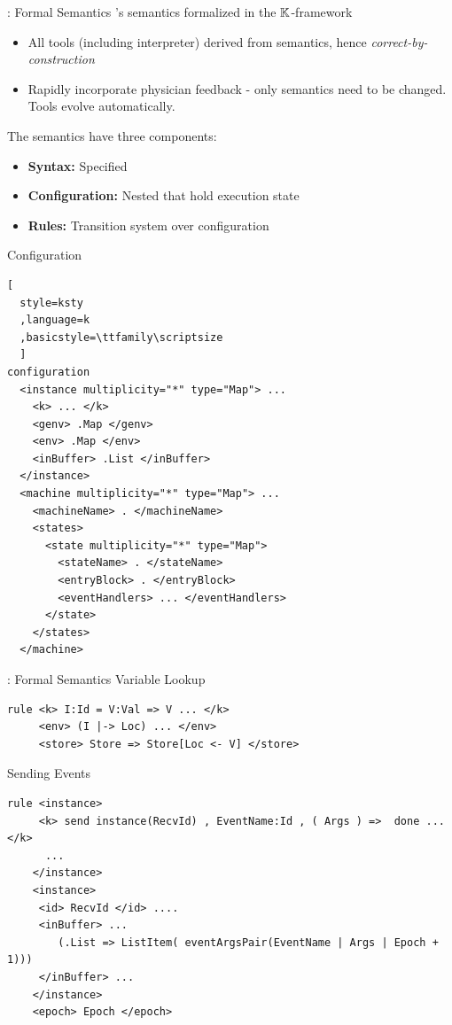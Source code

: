 \documentclass{beamer}
\begin{document}
\begin{frame}[fragile]{\MediK{}: Formal Semantics}
  \MediK{}'s semantics formalized in the $\mathbb{K}{}$-framework
  \begin{itemize}
    \item All tools (including interpreter) derived from semantics,
      hence \emph{correct-by-construction}
    \item Rapidly incorporate physician feedback - only
      semantics need to be changed. Tools evolve automatically.
  \end{itemize}
  \pause
  The semantics have three components:
  \begin{itemize}
    \item \textbf{Syntax:} Specified
    \item \textbf{Configuration:} Nested  that hold execution state
    \item \textbf{Rules:} Transition system over configuration
  \end{itemize}
\end{frame}
\begin{frame}[fragile]{\MediK{} Configuration}

\begin{lstlisting}[
  style=ksty
  ,language=k
  ,basicstyle=\ttfamily\scriptsize
  ]
configuration
  <instance multiplicity="*" type="Map"> ...
    <k> ... </k>
    <genv> .Map </genv>
    <env> .Map </env>
    <inBuffer> .List </inBuffer>
  </instance>
  <machine multiplicity="*" type="Map"> ...
    <machineName> . </machineName>
    <states>
      <state multiplicity="*" type="Map">
        <stateName> . </stateName>
        <entryBlock> . </entryBlock>
        <eventHandlers> ... </eventHandlers>
      </state>
    </states>
  </machine>
\end{lstlisting}
\end{frame}
\begin{frame}[fragile]{\MediK{}: Formal Semantics}
  Variable Lookup
  \begin{lstlisting}[language=k,style=ksty,basicstyle=\ttfamily\tiny]
rule <k> I:Id = V:Val => V ... </k>
     <env> (I |-> Loc) ... </env>
     <store> Store => Store[Loc <- V] </store>
  \end{lstlisting}
  \pause
  Sending Events
  \begin{lstlisting}[language=k,style=ksty,basicstyle=\ttfamily\tiny]
rule <instance>
     <k> send instance(RecvId) , EventName:Id , ( Args ) =>  done ... </k>
      ...
    </instance>
    <instance>
     <id> RecvId </id> ....
     <inBuffer> ...
        (.List => ListItem( eventArgsPair(EventName | Args | Epoch + 1)))
     </inBuffer> ...
    </instance>
    <epoch> Epoch </epoch>
  \end{lstlisting}
\end{frame}
\end{document}
